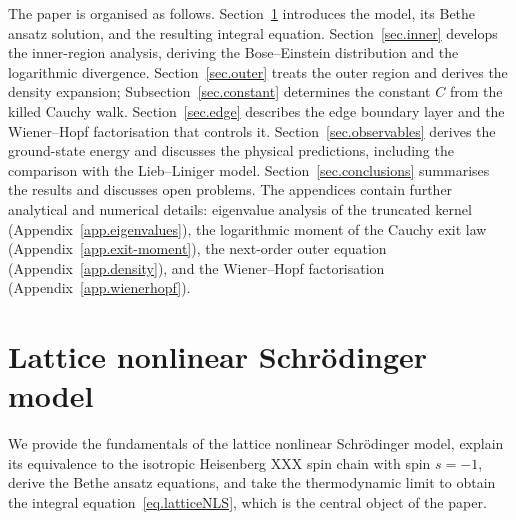 \documentclass[11pt,a4paper]{article}
\theoremstyle{definition}
\begin{document}
The paper is organised as follows.
Section~\ref{sec.model} introduces the model, its Bethe ansatz solution, and the resulting integral equation.
Section~\ref{sec.inner} develops the inner-region analysis, deriving the Bose--Einstein
distribution and the logarithmic divergence.
Section~\ref{sec.outer} treats the outer region and derives the density
expansion; Subsection~\ref{sec.constant} determines the constant $C$ from the
killed Cauchy walk.
Section~\ref{sec.edge} describes the edge boundary layer and the Wiener--Hopf
factorisation that controls it.
Section~\ref{sec.observables} derives the ground-state energy and discusses the physical predictions, including the comparison with the Lieb--Liniger model.
Section~\ref{sec.conclusions} summarises the results and discusses open problems.
The appendices contain further analytical and numerical details: eigenvalue analysis of the truncated kernel
(Appendix~\ref{app.eigenvalues}), the logarithmic moment of the Cauchy exit law
(Appendix~\ref{app.exit-moment}), the next-order outer equation
(Appendix~\ref{app.density}), and the Wiener--Hopf factorisation
(Appendix~\ref{app.wienerhopf}).








\section{Lattice nonlinear Schr\"odinger model}
\label{sec.model}
We provide the fundamentals of the lattice nonlinear Schr\"odinger model, explain its equivalence to the isotropic Heisenberg
XXX spin chain with spin $s = -1$, derive the Bethe ansatz equations,
and take the thermodynamic limit to obtain the integral
equation~\eqref{eq.latticeNLS}, which is the central object of
the paper.
\end{document}
